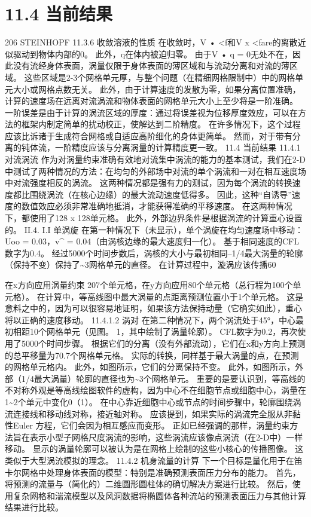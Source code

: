 \documentclass[UTF8,11pt,a4paper,openany,fontset=fandol]{ctexbook}
\begin{document}
\section{11.4 当前结果}
206 STEINHOPF 11.3.6 收敛溶液的性质 在收敛时，V • <f和V x <fare的离散近似驱动到物体内部的0。 此外，q在体内被迫归零。 由于V • q = 0无处不在，因此没有流经身体表面，涡量仅限于身体表面的薄区域和与流动分离和对流的薄区域。 这些区域是2-3个网格单元厚，与整个问题（在精细网格限制中）中的网格单元大小或网格点数无关。 此外，由于计算速度的发散为零，如果分离位置准确，计算的速度场在远离对流涡流和物体表面的网格单元大小上至少将是一阶准确。 一阶误差是由于计算的涡流区域的厚度：通过将误差视为位移厚度效应，可以在方法的框架内制定简单的扰动校正，使解达到二阶精度。 在许多情况下，这个过程应该比诉诸于生成符合网格或自适应高阶细化的身体更简单。 然而，对于带有分离的钝体流，一阶精度应该与分离涡量的计算精度更一致。 11.4 当前结果 11.4.1 对流涡流 作为对涡量约束准确有效地对流集中涡流的能力的基本测试，我们在2-D中测试了两种情况的方法：在均匀的外部场中对流的单个涡流和一对在相互速度场中对流强度相反的涡流。 这两种情况都是强有力的测试，因为每个涡流的转换速度都比围绕涡流（在核心边缘）的最大流动速度低得多。 因此，这种“自诱导”速度的数值效应必须非常准确地抵消，才能获得准确的平移速度。 在这两种情况下，都使用了128 x 128单元格。 此外，外部边界条件是根据涡流的计算重心设置的。 II.4. I.I 单涡旋 在第一种情况下（未显示），单个涡旋在均匀速度场中移动：Uoo = 0.03，v\textasciicircum{} = 0.04（由涡核边缘的最大速度归一化）。 基于相同速度的CFL数字为0.4。 经过5000个时间步数后，涡核的大小与最初相同--1/4最大涡量的轮廓（保持不变）保持了\textasciitilde{}3网格单元的直径。 在计算过程中，漩涡应该传播60

在x方向应用涡量约束 207个单元格，在y方向应用80个单元格（总行程为100个单元格）。 在计算中，等高线图中最大涡量的点距离预测位置小于1个单元格。 这是意料之中的，因为可以很容易地证明，如果该方法保持动量（它确实如此），重心将以正确的速度移动。 11.4.1.2 涡对 在第二种情况下，两个涡流处于45°，中心最初相距10个网格单元（见图。 1，其中绘制了涡量轮廓）。 CFL数字为0.2，再次使用了5000个时间步骤。 根据它们的分离（没有外部流动），它们在x和y方向上预测的总平移量为70.7个网格单元格。 实际的转换，同样基于最大涡量的点，在预测的网格单元格内。 此外，如图所示，它们的分离保持不变。 此外，如图所示，外部（1/4最大涡量）轮廓的直径也为\textasciitilde{}3个网格单元。 重要的是要认识到，等高线的不对称外观是等高线绘图软件的虚构，因为中心不在细胞节点或细胞中心，涡量在1\textasciitilde{}2个单元中变化0（1）。 在中心靠近细胞中心或节点的时间步骤中，轮廓围绕涡流连接线和移动线对称，接近轴对称。 应该提到，如果实际的涡流完全服从非黏性Euler 方程，它们会因为相互感应而变形。 正如已经强调的那样，涡量约束方法旨在表示小型子网格尺度涡流的影响，这些涡流应该像点涡流（在2-D中）一样移动。 显示的涡量轮廓可以被认为是在网格上绘制的这些小核心的传播图像。 这类似于大型涡流模拟的理念。 11.4.2 机身流量的计算 下一个目标是量化用于在笛卡尔网格中处理身体表面的模型：特别是准确预测表面压力分布的能力。 首先，将预测的流量与（简化的）二维圆形圆柱体的确切解决方案进行比较。 然后，使用复杂网格和湍流模型以及风洞数据将椭圆体各种流站的预测表面压力与其他计算结果进行比较。
\end{document}
